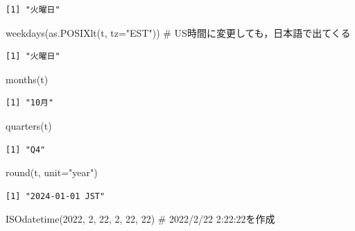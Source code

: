 \documentclass[
  letterpaper,
  DIV=11,
  numbers=noendperiod]{scrreprt}
\newenvironment{Shaded}{\begin{snugshade}}{\end{snugshade}}
\newcommand{\AttributeTok}[1]{\textcolor[rgb]{0.40,0.45,0.13}{#1}}
\newcommand{\CommentTok}[1]{\textcolor[rgb]{0.37,0.37,0.37}{#1}}
\newcommand{\DecValTok}[1]{\textcolor[rgb]{0.68,0.00,0.00}{#1}}
\newcommand{\FunctionTok}[1]{\textcolor[rgb]{0.28,0.35,0.67}{#1}}
\newcommand{\NormalTok}[1]{\textcolor[rgb]{0.00,0.23,0.31}{#1}}
\newcommand{\StringTok}[1]{\textcolor[rgb]{0.13,0.47,0.30}{#1}}
\begin{document}
\begin{verbatim}
[1] "火曜日"
\end{verbatim}

\begin{Shaded}
\begin{Highlighting}[]
\FunctionTok{weekdays}\NormalTok{(}\FunctionTok{as.POSIXlt}\NormalTok{(t, }\AttributeTok{tz=}\StringTok{"EST"}\NormalTok{)) }\CommentTok{\# US時間に変更しても，日本語で出てくる}
\end{Highlighting}
\end{Shaded}

\begin{verbatim}
[1] "火曜日"
\end{verbatim}

\begin{Shaded}
\begin{Highlighting}[]
\FunctionTok{months}\NormalTok{(t)}
\end{Highlighting}
\end{Shaded}

\begin{verbatim}
[1] "10月"
\end{verbatim}

\begin{Shaded}
\begin{Highlighting}[]
\FunctionTok{quarters}\NormalTok{(t)}
\end{Highlighting}
\end{Shaded}

\begin{verbatim}
[1] "Q4"
\end{verbatim}

\begin{Shaded}
\begin{Highlighting}[]
\FunctionTok{round}\NormalTok{(t, }\AttributeTok{unit=}\StringTok{"year"}\NormalTok{)}
\end{Highlighting}
\end{Shaded}

\begin{verbatim}
[1] "2024-01-01 JST"
\end{verbatim}

\begin{Shaded}
\begin{Highlighting}[]
\FunctionTok{ISOdatetime}\NormalTok{(}\DecValTok{2022}\NormalTok{, }\DecValTok{2}\NormalTok{, }\DecValTok{22}\NormalTok{, }\DecValTok{2}\NormalTok{, }\DecValTok{22}\NormalTok{, }\DecValTok{22}\NormalTok{) }\CommentTok{\# 2022/2/22 2:22:22を作成}
\end{Highlighting}
\end{Shaded}
\end{document}
